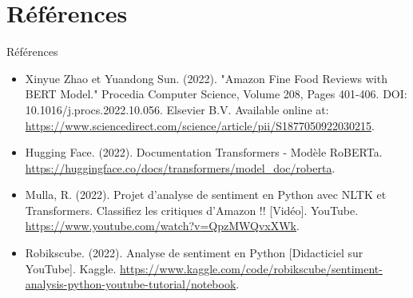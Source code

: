 \section{Références}
\begin{frame}{Références}
    \begin{itemize}
        \item Xinyue Zhao et Yuandong Sun. (2022). "Amazon Fine Food Reviews with BERT Model." Procedia Computer Science, Volume 208, Pages 401-406. DOI: 10.1016/j.procs.2022.10.056. Elsevier B.V. Available online at: \url{https://www.sciencedirect.com/science/article/pii/S1877050922030215}.
        
        \item Hugging Face. (2022). Documentation Transformers - Modèle RoBERTa. \url{https://huggingface.co/docs/transformers/model_doc/roberta}.
        
        \item Mulla, R. (2022). Projet d'analyse de sentiment en Python avec NLTK et Transformers. Classifiez les critiques d'Amazon !! [Vidéo]. YouTube. \url{https://www.youtube.com/watch?v=QpzMWQvxXWk}.
        
        \item Robikscube. (2022). Analyse de sentiment en Python [Didacticiel sur YouTube]. Kaggle. \url{https://www.kaggle.com/code/robikscube/sentiment-analysis-python-youtube-tutorial/notebook}.
    \end{itemize}
\end{frame}
